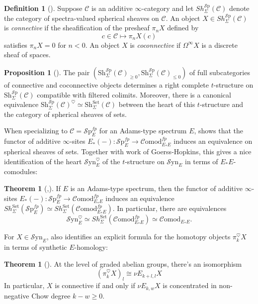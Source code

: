 \documentclass[10pt]{amsart}
\theoremstyle{definition}
\numberwithin{figure}{section}
\numberwithin{equation}{section}
\newtheorem{theorem}[figure]{Theorem}
\newtheorem{proposition}[figure]{Proposition}
\newtheorem{definition}[figure]{Definition}
\newcommand{\cC}{\mathcal{C}}
\theoremstyle{cited}
\newcommand{\Sp}{{\mathcal{S}\mathrm{p}}}
\newcommand{\Sh}{\mathrm{Sh}}
\newcommand{\Syn}{\mathcal{S}\mathrm{yn}}
\newcommand{\Comod}{\mathcal{C}\mathrm{omod}}
\begin{document}
\begin{definition}[\cite{Pst22}]
\label{con_cocon_defin}
Suppose $\cC$ is an additive $\infty$-category and let $Sh_{\Sigma}^{\Sp}(\cC)$ denote the category of spectra-valued spherical sheaves on $\cC$. An object $X\in Sh_{\Sigma}^{\Sp}(\cC)$ is \textit{connective} if the sheafification of the presheaf $\pi_nX$ defined by
$$
c\in\cC\mapsto \pi_nX(c)
$$
satisfies $\pi_nX=0$ for $n<0$. An object $X$ is \textit{coconnective} if $\Omega^{\infty}X$ is a discrete sheaf of spaces.
\end{definition}

\begin{proposition}[\cite{Pst22}]
\label{general_sheaf_tstruct_prop}
The pair $(\Sh_{\Sigma}^{\Sp}(\cC)_{\geq 0},\Sh_{\Sigma}^{\Sp}(\cC)_{\leq 0})$ of full subcategories of connective and coconnective objects determines a right
complete $t$-structure on $\Sh_{\Sigma}^{\Sp}(\cC)$ compatible with filtered colimits. Moreover, there is a canonical equivalence $\Sh_{\Sigma}^{\Sp}(\cC)^\heartsuit\simeq \Sh_{\Sigma}^{\mathrm{Set}}(\cC)$ between the heart of this $t$-structure and the category of
spherical sheaves of sets.
\end{proposition}

When specializing to $\cC=\Sp_E^{fp}$ for an Adams-type spectrum $E$, \cite{Pst22} shows that the functor of additive $\infty$-sites $E_*(-):\Sp_E^{fp}\to\Comod_{E_*E}^{fp}$ induces an equivalence on spherical sheaves of sets. Together with work of Goerss-Hopkins, this gives a nice identification of the heart $\Syn_E^\heartsuit$ of the $t$-structure on $\Syn_E$ in terms of $E_*E$-comodules:

\begin{theorem}[\cite{GH05},\cite{Pst22}]
If $E$ is an Adams-type spectrum, then the functor of additive $\infty$-sites $E_*(-):\Sp_E^{fp}\to\Comod_{E_*E}^{fp}$ induces an equivalence $Sh_{\Sigma}^{\mathrm{Set}}(\Sp_E^{fp})\simeq Sh_{\Sigma}^{\mathrm{Set}}(\Comod_{E_*E}^{fp}).$
In particular, there are equivalences
$$
\Syn_E^{\heartsuit}\simeq Sh_{\Sigma}^{\mathrm{Set}}(\Comod_{E_*E}^{fp})\simeq \Comod_{E_*E}.
$$
\end{theorem}

For $X\in\Syn_E$, \cite{Pst22} also identifies an explicit formula for the homotopy objects $\pi_k^\heartsuit X$ in terms of synthetic $E$-homology:

\begin{theorem}[\cite{Pst22}]
\label{SynE_homology_tstruct}
    At the level of graded abelian groups, there's an isomorphism
$$
(\pi_k^\heartsuit X)_l\cong \nu E_{k+l,l}X
$$
In particular, $X$ is connective if and only if $\nu E_{k,w}X$ is concentrated in non-negative Chow degree $k-w\geq 0$.
\end{theorem}
\end{document}
